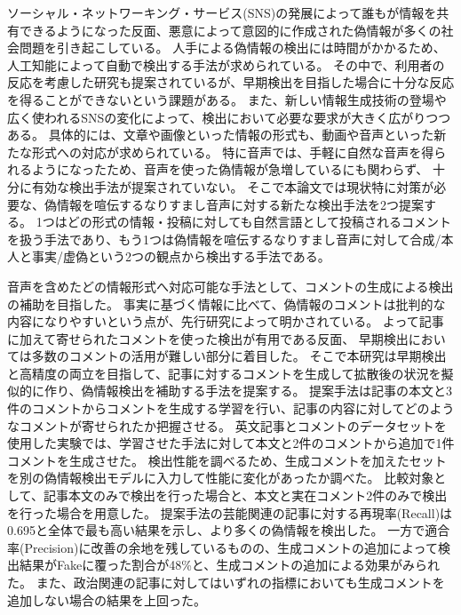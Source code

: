 ソーシャル・ネットワーキング・サービス(SNS)の発展によって誰もが情報を共有できるようになった反面、悪意によって意図的に作成された偽情報が多くの社会問題を引き起こしている。
人手による偽情報の検出には時間がかかるため、人工知能によって自動で検出する手法が求められている。
その中で、利用者の反応を考慮した研究も提案されているが、早期検出を目指した場合に十分な反応を得ることができないという課題がある。
また、新しい情報生成技術の登場や広く使われるSNSの変化によって、検出において必要な要求が大きく広がりつつある。
具体的には、文章や画像といった情報の形式も、動画や音声といった新たな形式への対応が求められている。
特に音声では、手軽に自然な音声を得られるようになったため、音声を使った偽情報が急増しているにも関わらず、
十分に有効な検出手法が提案されていない。
そこで本論文では現状特に対策が必要な、偽情報を喧伝するなりすまし音声に対する新たな検出手法を2つ提案する。
1つはどの形式の情報・投稿に対しても自然言語として投稿されるコメントを扱う手法であり、もう1つは偽情報を喧伝するなりすまし音声に対して合成/本人と事実/虚偽という2つの観点から検出する手法である。

音声を含めたどの情報形式へ対応可能な手法として、コメントの生成による検出の補助を目指した。
事実に基づく情報に比べて、偽情報のコメントは批判的な内容になりやすいという点が、先行研究によって明かされている。
よって記事に加えて寄せられたコメントを使った検出が有用である反面、
早期検出においては多数のコメントの活用が難しい部分に着目した。
そこで本研究は早期検出と高精度の両立を目指して、記事に対するコメントを生成して拡散後の状況を擬似的に作り、偽情報検出を補助する手法を提案する。
提案手法は記事の本文と3件のコメントからコメントを生成する学習を行い、記事の内容に対してどのようなコメントが寄せられたか把握させる。
英文記事とコメントのデータセットを使用した実験では、学習させた手法に対して本文と2件のコメントから追加で1件コメントを生成させた。
検出性能を調べるため、生成コメントを加えたセットを別の偽情報検出モデルに入力して性能に変化があったか調べた。
比較対象として、記事本文のみで検出を行った場合と、本文と実在コメント2件のみで検出を行った場合を用意した。
提案手法の芸能関連の記事に対する再現率(Recall)は0.695と全体で最も高い結果を示し、より多くの偽情報を検出した。
一方で適合率(Precision)に改善の余地を残しているものの、生成コメントの追加によって検出結果がFakeに覆った割合が48\%と、生成コメントの追加による効果がみられた。
また、政治関連の記事に対してはいずれの指標においても生成コメントを追加しない場合の結果を上回った。

